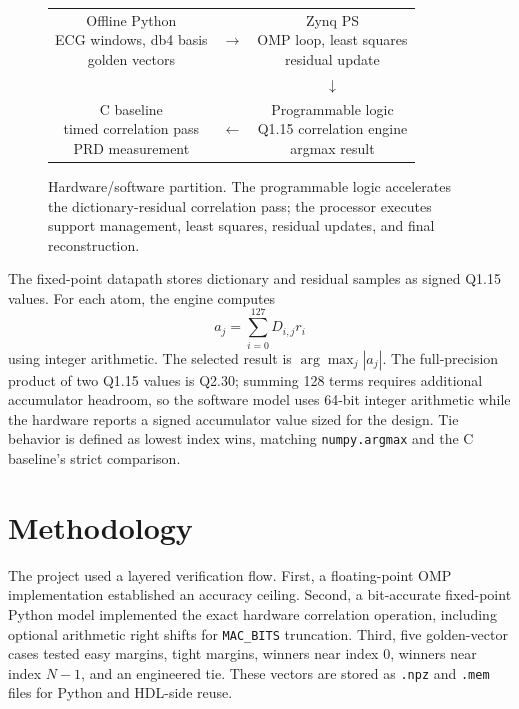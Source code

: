 \documentclass[onecolumn,conference]{IEEEtran}
\begin{document}
\begin{figure}[t]
    \centering
    \small
    \setlength{\fboxsep}{5pt}
    \begin{tabular}{c c c}
    \fbox{\parbox{0.25\linewidth}{\centering Offline Python\\ECG windows, db4 basis\\golden vectors}}
    & $\longrightarrow$ &
    \fbox{\parbox{0.25\linewidth}{\centering Zynq PS\\OMP loop, least squares\\residual update}} \\
    && $\downarrow$ \\
    \fbox{\parbox{0.25\linewidth}{\centering C baseline\\timed correlation pass\\PRD measurement}}
    & $\longleftarrow$ &
    \fbox{\parbox{0.25\linewidth}{\centering Programmable logic\\Q1.15 correlation engine\\argmax result}} \\
    \end{tabular}
    \caption{Hardware/software partition. The programmable logic accelerates the dictionary-residual correlation pass; the processor executes support management, least squares, residual updates, and final reconstruction.}
    \label{fig:arch}
\end{figure}

The fixed-point datapath stores dictionary and residual samples as signed Q1.15 values. For each atom, the engine computes
\begin{equation}
    a_j = \sum_{i=0}^{127} D_{i,j} r_i
\end{equation}
using integer arithmetic. The selected result is $\arg\max_j |a_j|$. The full-precision product of two Q1.15 values is Q2.30; summing 128 terms requires additional accumulator headroom, so the software model uses 64-bit integer arithmetic while the hardware reports a signed accumulator value sized for the design. Tie behavior is defined as lowest index wins, matching \texttt{numpy.argmax} and the C baseline's strict comparison.

\section{Methodology}
The project used a layered verification flow. First, a floating-point OMP implementation established an accuracy ceiling. Second, a bit-accurate fixed-point Python model implemented the exact hardware correlation operation, including optional arithmetic right shifts for \texttt{MAC\_BITS} truncation. Third, five golden-vector cases tested easy margins, tight margins, winners near index 0, winners near index $N-1$, and an engineered tie. These vectors are stored as \texttt{.npz} and \texttt{.mem} files for Python and HDL-side reuse.
\end{document}
